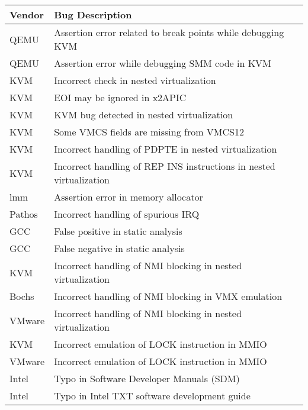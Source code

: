 \documentclass{standalone}
\begin{document}
%

\begin{tabular}{ l | l }\hline
Vendor & Bug Description \\ \hline
QEMU\footnotemark & Assertion error related to break points while debugging KVM\footnotemark \\
QEMU & Assertion error while debugging SMM code in KVM\footnotemark \\
KVM\footnotemark & Incorrect check in nested virtualization\footnotemark \\
KVM & EOI may be ignored in x2APIC\footnotemark \\
KVM & KVM bug detected in nested virtualization\footnotemark \\
KVM & Some VMCS fields are missing from VMCS12\footnotemark \\
KVM & Incorrect handling of PDPTE in nested virtualization\footnotemark \\
KVM & Incorrect handling of REP INS instructions in nested virtualization\footnotemark \\
lmm\footnotemark & Assertion error in memory allocator\footnotemark \\
Pathos\footnotemark & Incorrect handling of spurious IRQ\footnotemark \\
GCC\footnotemark & False positive in static analysis\footnotemark \\
GCC & False negative in static analysis\footnotemark \\
KVM & Incorrect handling of NMI blocking in nested virtualization\footnotemark \\
Bochs\footnotemark & Incorrect handling of NMI blocking in VMX emulation\footnotemark \\
VMware\footnotemark & Incorrect handling of NMI blocking in nested virtualization\footnotemark \\
KVM & Incorrect emulation of LOCK instruction in MMIO\footnotemark \\
VMware & Incorrect emulation of LOCK instruction in MMIO\footnotemark \\
Intel\footnotemark & Typo in Software Developer Manuals (SDM)\footnotemark \\
Intel & Typo in Intel TXT software development guide\footnotemark \\
\end{tabular}
\end{document}
